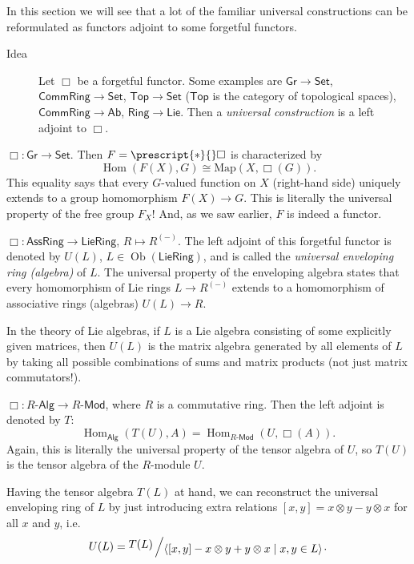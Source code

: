 \documentclass[english,letterpaper]{article}%
\numberwithin{equation}{section}
\numberwithin{figure}{section}
\numberwithin{table}{section}
\theoremstyle{definition}
\theoremstyle{definition}
\theoremstyle{definition}
\theoremstyle{plain}
\theoremstyle{plain}
\theoremstyle{plain}
\theoremstyle{plain}
\theoremstyle{remark}
\theoremstyle{remark}
\DeclareMathOperator{\ob}{Ob}
\DeclareMathOperator{\Hom}{Hom}
\newcommand{\bigslant}[2]{{\raisebox{.2em}{$#1$}\left/\raisebox{-.2em}{$#2$}\right.}}
\begin{document}
In this section we will see that a lot of the familiar universal constructions
can be reformulated as functors adjoint to some forgetful functors. 
\begin{description}
\item [{Idea}] Let $\Box$ be a forgetful functor. Some examples are $\mathsf{Gr}\to\mathsf{Set}$,
$\mathsf{CommRing}\to\mathsf{Set}$, $\mathsf{Top}\to\mathsf{Set}$
($\mathsf{Top}$ is the category of topological spaces), $\mathsf{CommRing}\to\mathsf{Ab}$,
$\mathsf{Ring}\to\mathsf{Lie}$. Then a \emph{universal construction}
is a left adjoint to $\Box$.
\end{description}
\begin{example}
$\Box:\mathsf{Gr}\to\mathsf{Set}$. Then $F=\prescript{\ast}{}\Box$ is characterized
by 
\[
\Hom\left(F(X),G\right)\cong\mathrm{Map}\left(X,\Box\left(G\right)\right).
\]
This equality says that every $G$-valued function on $X$ (right-hand
side) uniquely extends to a group homomorphism $F(X)\to G$. This
is literally the universal property of the free group $F_{X}$! And, as we saw earlier, $F$ is indeed a functor.
\end{example}
%
\begin{example}
$\Box:\mathsf{AssRing}\to\mathsf{LieRing}$, $R\mapsto R^{(-)}$.
The left adjoint of this forgetful functor is denoted by $U(L)$,
$L\in\ob\left(\mathsf{LieRing}\right)$, and is called the \emph{universal
enveloping ring (algebra)} of $L$. The universal property of the
enveloping algebra states that every homomorphism of Lie rings $L\to R^{(-)}$
extends to a homomorphism of associative rings (algebras) $U\left(L\right)\to R$. 

In the theory of Lie algebras, if $L$ is a Lie algebra consisting
of some explicitly given matrices, then $U(L)$ is the matrix algebra
generated by all elements of $L$ by taking all possible combinations
of sums and matrix products (not just matrix commutators!).
\end{example}
%
\begin{example}
$\Box:R\text{-}\mathsf{Alg}\to R\text{-}\mathsf{Mod}$, where $R$
is a commutative ring. Then the left adjoint is denoted by $T$:
\[
\Hom_{\mathsf{Alg}}\left(T(U),A\right)=\Hom_{R\text{-}\mathsf{Mod}}\left(U,\Box\left(A\right)\right).
\]
Again, this is literally the universal property of the tensor algebra
of $U$, so $T(U)$ is the tensor algebra of the $R$-module $U$.

Having the tensor algebra $T(L)$ at hand, we can reconstruct the
universal enveloping ring of $L$ by just introducing extra relations
$\left[x,y\right]=x\otimes y-y\otimes x$ for all $x$ and $y$, i.e.
\[
U(L)=\bigslant{T(L)}{\left\langle [x,y]-x\otimes y+y\otimes x\mid x,y\in L\right\rangle }.
\]
\end{example}
\end{document}
